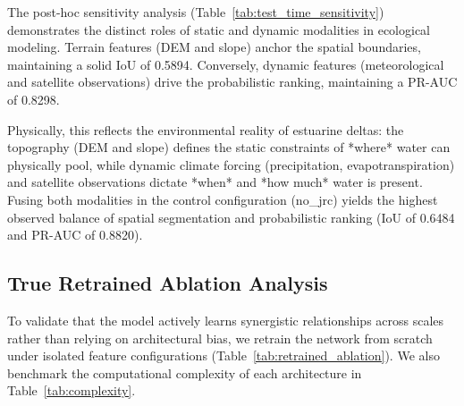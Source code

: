 \documentclass[preprint,12pt]{elsarticle}
\begin{document}
The post-hoc sensitivity analysis (Table~\ref{tab:test_time_sensitivity}) demonstrates the distinct roles of static and dynamic modalities in ecological modeling. Terrain features (DEM and slope) anchor the spatial boundaries, maintaining a solid IoU of 0.5894. Conversely, dynamic features (meteorological and satellite observations) drive the probabilistic ranking, maintaining a PR-AUC of 0.8298. 

Physically, this reflects the environmental reality of estuarine deltas: the topography (DEM and slope) defines the static constraints of *where* water can physically pool, while dynamic climate forcing (precipitation, evapotranspiration) and satellite observations dictate *when* and *how much* water is present. Fusing both modalities in the control configuration (no\_jrc) yields the highest observed balance of spatial segmentation and probabilistic ranking (IoU of 0.6484 and PR-AUC of 0.8820).

\subsection{True Retrained Ablation Analysis}
To validate that the model actively learns synergistic relationships across scales rather than relying on architectural bias, we retrain the network from scratch under isolated feature configurations (Table~\ref{tab:retrained_ablation}). We also benchmark the computational complexity of each architecture in Table~\ref{tab:complexity}.

\begin{table}[htbp]
\caption{Retrained Ablation Study Results with 95\% Block Bootstrap CIs}
\label{tab:retrained_ablation}
\centering
{}
\end{table}
\end{document}
